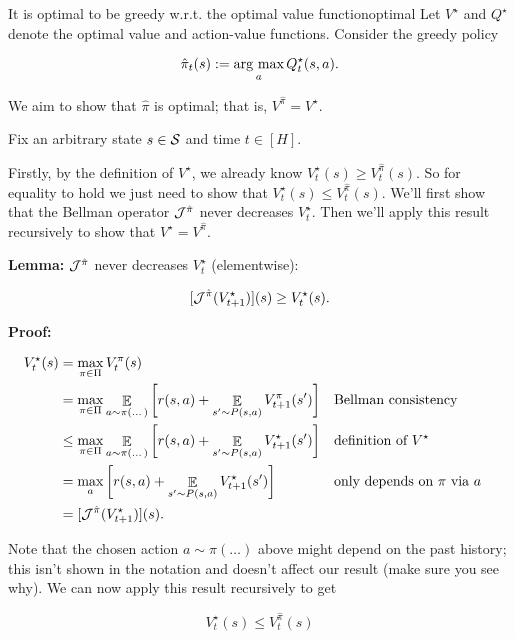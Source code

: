 \documentclass[../main/main]{subfiles}
\begin{document}
\begin{theorem}{It is optimal to be greedy w.r.t. the optimal value function}{optimal}
    Let $V^{\star}$ and $Q^{\star}$ denote the optimal value and action-value functions. Consider the greedy policy

    \[
        \hat \pi_t(s) := \argmax_a Q_t^{\star}(s, a).
    \]

    We aim to show that $\hat \pi$ is optimal; that is, $V^{\hat \pi} = V^{\star}$.

    Fix an arbitrary state $s \in \S$ and time $t \in [H]$.

    Firstly, by the definition of $V^{\star}$, we already know $V_t^{\star}(s) \ge V_t^{\hat \pi}(s)$. So for equality to hold we just need to show that $V_t^{\star}(s) \le V_t^{\hat \pi}(s)$. We'll first show that the Bellman operator $\bop^{\hat \pi}$ never decreases $V_t^{\star}$. Then we'll apply this result recursively to show that $V^{\star} = V^{\hat \pi}$.
    
    \textbf{Lemma:} $\bop^{\hat \pi}$ never decreases $V_t^{\star}$ (elementwise):
    
    \[
        [\bop^{\hat \pi} (V_{t+1}^{\star})](s) \ge V_t^{\star}(s).
    \]
    
    \textbf{Proof:}
    
    \begin{align*}
    V_t^{\star}(s) &= \max_{\pi \in \Pi} V_t^{\pi}(s) \\
    &= \max_{\pi \in \Pi} \mathop{\mathbb{E}}_{a \sim \pi(\dots)}\left[r(s, a) + \mathop{\mathbb{E}}_{s' \sim P(s, a)} V_{t+1}^\pi(s') \right] && \text{Bellman consistency} \\
    &\le \max_{\pi \in \Pi} \mathop{\mathbb{E}}_{a \sim \pi(\dots)}\left[r(s, a) + \mathop{\mathbb{E}}_{s' \sim P(s, a)} V_{t+1}^{\star}(s') \right] && \text{definition of } V^\star \\
    &= \max_{a} \left[ r(s, a) + \mathop{\mathbb{E}}_{s' \sim P(s, a)} V_{t+1}^{\star}(s') \right] && \text{only depends on } \pi \text{ via } a \\
    &= [\bop^{\hat \pi}(V_{t+1}^{\star})](s).
    \end{align*}
    
    Note that the chosen action $a \sim \pi(\dots)$ above might depend on the past history; this isn't shown in the notation and doesn't affect our result (make sure you see why). We can now apply this result recursively to get
    
    $$
    V^{\star}_t(s) \le V^{\hat \pi}_t(s)
    $$


\end{theorem}
\end{document}

